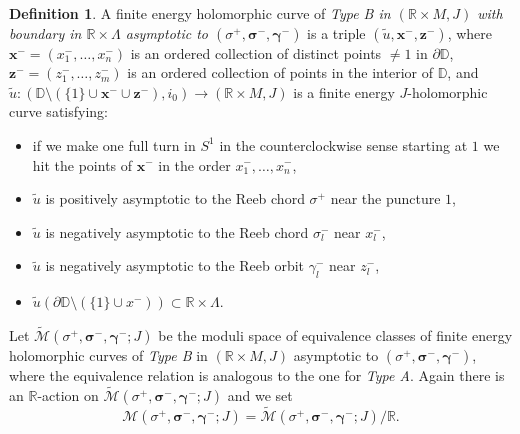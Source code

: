 \documentclass[JEP,XML,SOM,Unicode,NoFloatCountersInSection]{cedram}
\let\mathcal\mathscr
\newcommand{\bmx}{\boldsymbol{x}}
\newcommand{\bmz}{\boldsymbol{z}}
\theoremstyle{plain}
\theoremstyle{definition}
\newtheorem{defn}[thm]{Definition}
\numberwithin{equation}{subsection}
\newcommand{\RR}{\mathbb{R}}
\let\bs\boldsymbol
\begin{document}
\begin{defn}
A finite energy holomorphic curve of {\em \emph{Type B} in $(\mathbb{R}\times M,J)$ with boundary in $\mathbb{R}\times \Lambda$ asymptotic to $(\sigma^+,\bs\sigma^-,\bs\gamma^-)$} is a triple $(\widetilde{u},\bmx^-,\bmz^-)$, where $\bmx^- = (x^-_1,\dots,x^-_n)$ is an ordered collection of distinct points $\not=1$ in $\partial \mathbb{D}$, $\bmz^-=(z^-_1,\dots,z^-_m)$ is an ordered collection of points in the interior of $\mathbb{D}$, and $\widetilde{u}: (\mathbb{D} \setminus (\{1\}\cup \bmx^- \cup \bmz^-), i_0) \to (\mathbb{R}\times M,J)$ is a finite energy $J$-holomorphic curve satisfying:
\begin{itemize}
\item if we make one full turn in $S^1$ in the counterclockwise sense starting at $1$ we hit the points of $\bmx^-$ in the order $x^-_1,\dots,x^-_n$,
\item $\widetilde{u}$ is positively asymptotic to the Reeb chord $\sigma^+$ near the puncture $1$,
\item $\widetilde{u}$ is negatively asymptotic to the Reeb chord $\sigma^-_l$ near $x^-_l$,
\item $\widetilde{u}$ is negatively asymptotic to the Reeb orbit $\gamma^-_l$ near $z^-_l$,
\item $\widetilde{u}(\partial \mathbb{D} \setminus (\{1\}\cup x^-)) \subset \mathbb{R}\times \Lambda$.
\end{itemize}
\end{defn}

Let $\widetilde{\mathcal{M}}(\sigma^+,\bs\sigma^-,\bs\gamma^-;J)$ be the moduli space of equivalence classes of finite energy holomorphic curves of \emph{Type B} in $(\mathbb{R}\times M,J)$ asymptotic to $(\sigma^+,\bs\sigma^-,\bs\gamma^-)$, where the equivalence relation is analogous to the one for \emph{Type A}. Again there is an $\mathbb{R}$-action on $\widetilde{\mathcal{M}}(\sigma^+,\bs\sigma^-,\bs\gamma^-;J)$ and we set
$${\mathcal{M}}(\sigma^+,\bs\sigma^-,\bs\gamma^-;J)=\widetilde{\mathcal{M}}(\sigma^+,\bs\sigma^-,\bs\gamma^-;J)/\RR.$$
\end{document}
